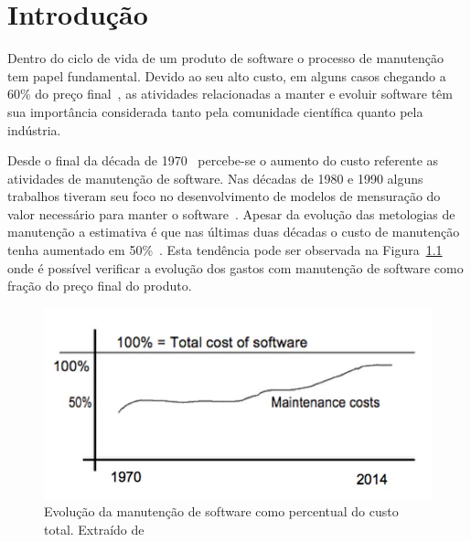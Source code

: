 \chapter{Introdução}
\label{ch:intro}

Dentro do ciclo de vida de um produto de software o processo de manutenção tem
papel fundamental. Devido ao seu alto custo, em alguns casos chegando a 60\% do
preço final~\cite{kaur2015review}, as atividades relacionadas a manter e evoluir
software têm sua importância considerada tanto pela comunidade científica quanto
pela indústria.

Desde o final da década de 1970~\cite{Zelkowitz:1979:PSE:578504} percebe-se o
aumento do custo referente as atividades de  manutenção de software. Nas décadas
de 1980 e 1990 alguns trabalhos tiveram seu foco no desenvolvimento de modelos
de mensuração do valor necessário para manter o
software~\cite{Herrin:1985:SMC:323287.323383,hirota1994approach}. Apesar da
evolução das metologias de manutenção a estimativa é que nas últimas duas
décadas o custo de manutenção tenha aumentado em
50\%~\cite{koskinen2010software}. Esta tendência pode ser observada na
Figura~\ref{fig:software-maintence-costs} onde é possível verificar a
evolução dos gastos com manutenção de software como fração do preço final do
produto.

\begin{figure}[htpb]
\centering
\includegraphics[width=0.7\linewidth]
				{./chapter-intro/img/software-maintence-costs.png}
\caption{Evolução da manutenção de software como percentual do custo total.
	Extraído de~\cite{engelbertink2010save}}
\label{fig:software-maintence-costs}
\end{figure}

